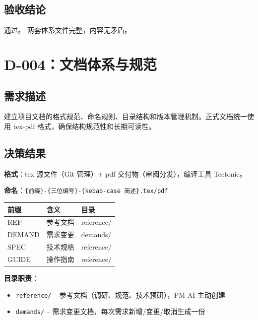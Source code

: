 \documentclass[11pt,a4paper]{article}
\begin{document}
\subsection{验收结论}

\textcolor{success}{通过。} 两套体系文件完整，内容无矛盾。

\section{D-004：文档体系与规范}

\subsection{需求描述}

建立项目文档的格式规范、命名规则、目录结构和版本管理机制。正式文档统一使用 tex-pdf 格式，确保结构规范性和长期可读性。

\subsection{决策结果}

\textbf{格式}：tex 源文件（Git 管理）+ pdf 交付物（审阅分发），编译工具 Tectonic。

\textbf{命名}：\texttt{\{前缀\}-\{三位编号\}-\{kebab-case 简述\}.tex/pdf}

\begin{table}[h]
\centering
\begin{tabular}{lll}
\toprule
\textbf{前缀} & \textbf{含义} & \textbf{目录} \\
\midrule
REF & 参考文档 & reference/ \\
DEMAND & 需求变更 & demands/ \\
SPEC & 技术规格 & reference/ \\
GUIDE & 操作指南 & reference/ \\
\bottomrule
\end{tabular}
\end{table}

\textbf{目录职责}：
\begin{itemize}[nosep]
  \item \texttt{reference/} -- 参考文档（调研、规范、技术预研），PM AI 主动创建
  \item \texttt{demands/} -- 需求变更文档，每次需求新增/变更/取消生成一份
\end{itemize}
\end{document}
